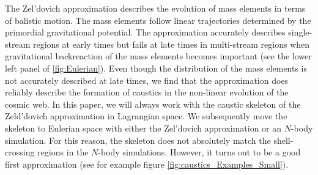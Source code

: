 \documentclass[a4paper, 11pt]{article}
\begin{document}
The Zel'dovich approximation describes the evolution of mass elements in terms of balistic motion. The mass elements follow linear trajectories determined by the primordial gravitational potential. The approximation accurately describes single-stream regions at early times but fails at late times in multi-stream regions when gravitational backreaction of the mass elements becomes important (see the lower left panel of \ref{fig:Eulerian}). Even though the distribution of the mass elements is not accurately described at late times, we find that the approximation does reliably describe the formation of caustics in the non-linear evolution of the cosmic web. In this paper, we will always work with the caustic skeleton of the Zeld'dovich approximation in Lagrangian space. We subsequently move the skeleton to Eulerian space with either the Zel'dovich approximation or an $N$-body simulation. For this reason, the skeleton does not absolutely match the shell-crossing regions in the $N$-body simulations. However, it turns out to be a good first approximation (see for example figure \ref{fig:caustics_Examples_Small}).
\end{document}

